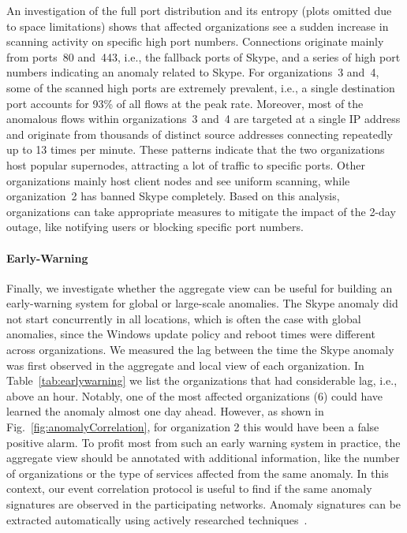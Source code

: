 \documentclass[letterpaper,11pt,onecolumn,titlepage]{article}
\begin{document}
An investigation of the full port distribution and its entropy (plots
omitted due to space limitations) shows that affected organizations
see a sudden increase in scanning activity on specific high port
numbers. Connections originate mainly from ports~80 and~443, i.e.,
the fallback ports of Skype, and a series of high port numbers
indicating an anomaly related to Skype. For organizations~3 and~4,
some of the scanned high ports are extremely prevalent, i.e., a single
destination port accounts for 93\% of all flows at the peak rate.
Moreover, most of the anomalous flows within organizations~3 and~4 are
targeted at a single IP address and originate from thousands of
distinct source addresses connecting repeatedly up to 13 times per
minute. These patterns indicate that the two organizations host
popular supernodes, attracting a lot of traffic to specific
ports. Other organizations mainly host client nodes and see uniform
scanning, while organization~2 has banned Skype completely. Based on
this analysis, organizations can take appropriate measures to
mitigate the impact of the 2-day outage, like notifying users or
blocking specific port numbers.








\paragraph{Early-Warning}
Finally, we investigate whether the aggregate view can be useful for
building an early-warning system for global or large-scale anomalies.
The Skype anomaly did not start concurrently in all locations, which
is often the case with global anomalies, since the Windows update
policy and reboot times were different across organizations. We
measured the lag between the time the Skype anomaly was first observed
in the aggregate and local view of each organization. In
Table~\ref{tab:earlywarning} we list the organizations that had
considerable lag, i.e., above an hour. Notably, one of the most
affected organizations (6) could have learned the anomaly almost one day ahead.
However, as shown in Fig.~\ref{fig:anomalyCorrelation}, for
organization 2 this would have been a false positive alarm. To profit
most from such an early warning system in practice, the aggregate view
should be annotated with additional information, like the number of
organizations or the type of services affected from the same
anomaly. In this context, our event correlation protocol is
useful to find if the same anomaly signatures are observed in the
participating networks. Anomaly signatures can be extracted
automatically using actively researched
techniques~\cite{Brauckhoff2009a,Ranjan2007}.
\end{document}
